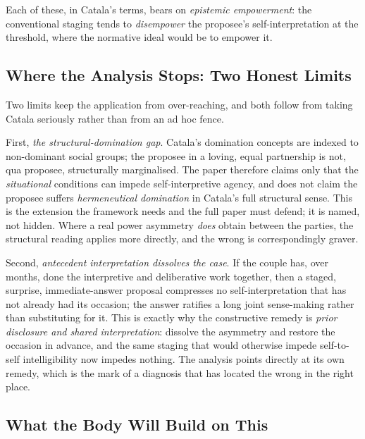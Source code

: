 \documentclass[11pt,a4paper]{article}
\begin{document}
Each of these, in Catala's terms, bears on \emph{epistemic empowerment}: the conventional staging tends to \emph{disempower} the proposee's self-interpretation at the threshold, where the normative ideal would be to empower it.

\subsection{Where the Analysis Stops: Two Honest Limits}\label{p06:sec:limits}

Two limits keep the application from over-reaching, and both follow from taking Catala seriously rather than from an ad hoc fence.

First, \emph{the structural-domination gap}. Catala's domination concepts are indexed to non-dominant social groups; the proposee in a loving, equal partnership is not, qua proposee, structurally marginalised. The paper therefore claims only that the \emph{situational} conditions can impede self-interpretive agency, and does not claim the proposee suffers \emph{hermeneutical domination} in Catala's full structural sense. This is the extension the framework needs and the full paper must defend; it is named, not hidden. Where a real power asymmetry \emph{does} obtain between the parties, the structural reading applies more directly, and the wrong is correspondingly graver.

Second, \emph{antecedent interpretation dissolves the case}. If the couple has, over months, done the interpretive and deliberative work together, then a staged, surprise, immediate-answer proposal compresses no self-interpretation that has not already had its occasion; the answer ratifies a long joint sense-making rather than substituting for it. This is exactly why the constructive remedy is \emph{prior disclosure and shared interpretation}: dissolve the asymmetry and restore the occasion in advance, and the same staging that would otherwise impede self-to-self intelligibility now impedes nothing. The analysis points directly at its own remedy, which is the mark of a diagnosis that has located the wrong in the right place.

\subsection{What the Body Will Build on This}
\end{document}
